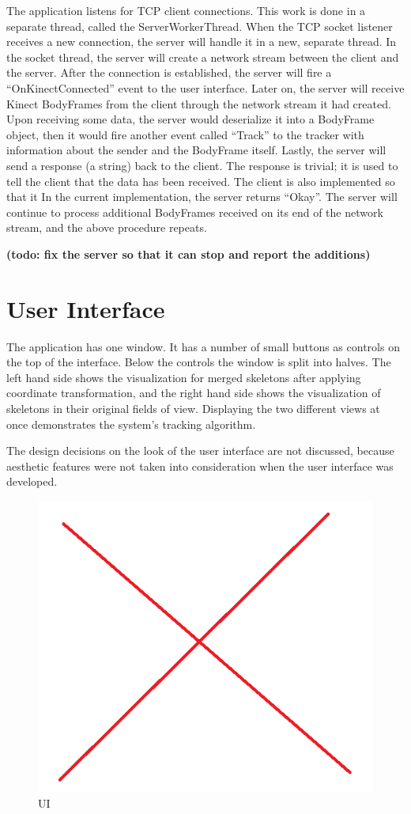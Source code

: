 The application listens for TCP client connections. This work is done in a separate thread, called the ServerWorkerThread. When the TCP socket listener receives a new connection, the server will handle it in a new, separate thread. In the socket thread, the server will create a network stream between the client and the server. After the connection is established, the server will fire a ``OnKinectConnected'' event to the user interface. Later on, the server will receive Kinect BodyFrames from the client through the network stream it had created. Upon receiving some data, the server would deserialize it into a BodyFrame object, then it would fire another event called ``Track'' to the tracker with information about the sender and the BodyFrame itself. Lastly, the server will send a response (a string) back to the client. The response is trivial; it is used to tell the client that the data has been received. The client is also implemented so that it In the current implementation, the server returns ``Okay''. The server will continue to process additional BodyFrames received on its end of the network stream, and the above procedure repeats.

\textbf{(todo: fix the server so that it can stop and report the additions)}

\section{User Interface}
\label{sec:implementation_ui}

The application has one window. It has a number of small buttons as controls on the top of the interface. Below the controls the window is split into halves. The left hand side shows the visualization for merged skeletons after applying coordinate transformation, and the right hand side shows the visualization of skeletons in their original fields of view. Displaying the two different views at once demonstrates the system's tracking algorithm.

The design decisions on the look of the user interface are not discussed, because aesthetic features were not taken into consideration when the user interface was developed.

\begin{figure}[!h]
  \centering
  \includegraphics[width=0.8\linewidth]{figs/ui}
  \caption{UI}
  \label{fig:ui}
\end{figure}

